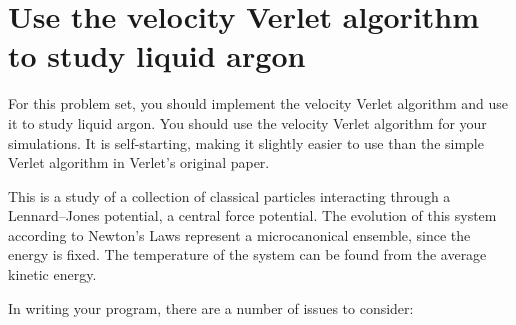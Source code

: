 \section{Use the velocity Verlet algorithm to study liquid argon}

\Question For this problem set, you should implement the velocity Verlet algorithm and use
it to study liquid argon. You should use the
velocity Verlet algorithm for your simulations. It is self-starting, making it slightly
easier to use than the simple Verlet algorithm in Verlet's original paper.

This is a study of a collection of classical particles interacting through a Lennard--Jones
potential, a central force potential. The evolution of this system according to Newton's
Laws represent a microcanonical ensemble, since the energy is fixed. The temperature of the
system can be found from the average kinetic energy.

In writing your program, there are a number of issues to consider:


